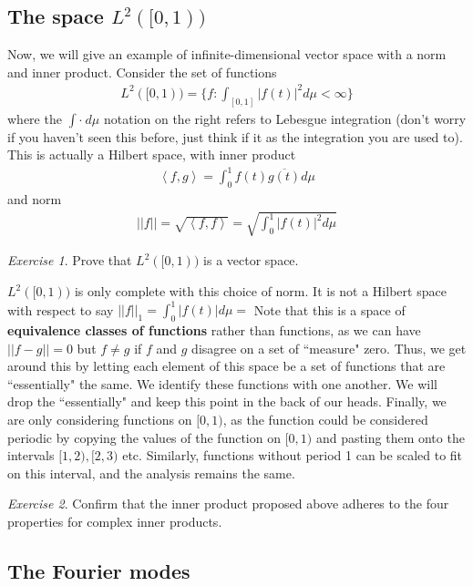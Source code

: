 \documentclass[11pt]{article}
\newcommand{\ip}[2]{\left\langle #1, #2\right\rangle}
\theoremstyle{plain}
\theoremstyle{definition}
\theoremstyle{remark}
\newtheorem{exc}{Exercise}[section]
\begin{document}
\subsection*{The space $L^2([0, 1))$}

Now, we will give an example of infinite-dimensional vector space with a norm and inner product. Consider the set of functions
\begin{align*}
    L^2([0,1)) = \{f : \int_{[0,1]} |f(t)|^2 d\mu < \infty \}
\end{align*}
where the $\int \cdot \ d\mu$ notation on the right refers to Lebesgue integration (don't worry if you haven't seen this before, just think if it as the integration you are used to). This is actually a Hilbert space, with inner product
\begin{align*}
    \ip{f}{g} = \int_0^1 f(t)\overline{g(t)} d\mu
\end{align*}
and norm
\begin{align*}
    ||f|| = \sqrt{\ip{f}{f}} = \sqrt{\int_0^1 |f(t)|^2 d\mu}
\end{align*}
\begin{exc}
    Prove that $L^2([0, 1))$ is a vector space.
\end{exc}
$L^2([0,1))$ is only complete with this choice of norm. It is not a Hilbert space with respect to say $||f||_1 = \int_0^1 |f(t)| d\mu = $ Note that this is a space of {\bf equivalence classes of functions} rather than functions, as we can have $||f-g|| = 0$ but $f \neq g$ if $f$ and $g$ disagree on a set of ``measure" zero. Thus, we get around this by letting each element of this space be a set of functions that are ``essentially" the same. We identify these functions with one another. We will drop the ``essentially" and keep this point in the back of our heads. Finally, we are only considering functions on $[0, 1)$, as the function could be considered periodic by copying the values of the function on $[0, 1)$ and pasting them onto the intervals $[1, 2), [2,3)$ etc. Similarly, functions without period 1 can be scaled to fit on this interval, and the analysis remains the same.
\begin{exc}
    Confirm that the inner product proposed above adheres to the four properties for complex inner products.
\end{exc}

\subsection*{The Fourier modes}
\end{document}
